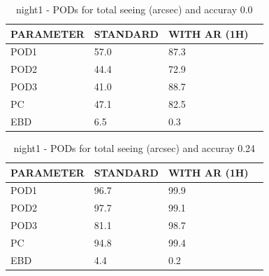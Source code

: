 \begin{table}[p!]
\begin{center}
\begin{tabular}{|l|l|l|l|}
\hline
\multicolumn{1}{|c|}{\cellcolor[HTML]{C0C0C0}\textbf{PARAMETER}} & \multicolumn{1}{c|}{\cellcolor[HTML]{C0C0C0}\textbf{STANDARD}} & \multicolumn{1}{c|}{\cellcolor[HTML]{C0C0C0}\textbf{WITH AR (1H)}} \\
\hline
\cellcolor[HTML]{C0C0C0}POD1  & 57.0                                & 87.3         \\
\cellcolor[HTML]{C0C0C0}POD2  & 44.4                                & 72.9         \\
\cellcolor[HTML]{C0C0C0}POD3  & 41.0                                & 88.7         \\
\cellcolor[HTML]{C0C0C0}PC    & 47.1                                  & 82.5           \\
\cellcolor[HTML]{C0C0C0}EBD   & 6.5                                 & 0.3          \\
\hline
\end{tabular}
\caption{night1 - PODs for total seeing (arcsec) and accuray 0.0}
\label{tab:podsee0.0:night1}
\end{center}
\end{table}
\begin{table}[p!]
\begin{center}
\begin{tabular}{|l|l|l|l|}
\hline
\multicolumn{1}{|c|}{\cellcolor[HTML]{C0C0C0}\textbf{PARAMETER}} & \multicolumn{1}{c|}{\cellcolor[HTML]{C0C0C0}\textbf{STANDARD}} & \multicolumn{1}{c|}{\cellcolor[HTML]{C0C0C0}\textbf{WITH AR (1H)}} \\
\hline
\cellcolor[HTML]{C0C0C0}POD1  & 96.7                                & 99.9         \\
\cellcolor[HTML]{C0C0C0}POD2  & 97.7                                & 99.1         \\
\cellcolor[HTML]{C0C0C0}POD3  & 81.1                                & 98.7         \\
\cellcolor[HTML]{C0C0C0}PC    & 94.8                                  & 99.4           \\
\cellcolor[HTML]{C0C0C0}EBD   & 4.4                                 & 0.2          \\
\hline
\end{tabular}
\caption{night1 - PODs for total seeing (arcsec) and accuray 0.24}
\label{tab:podsee0.24:night1}
\end{center}
\end{table}
